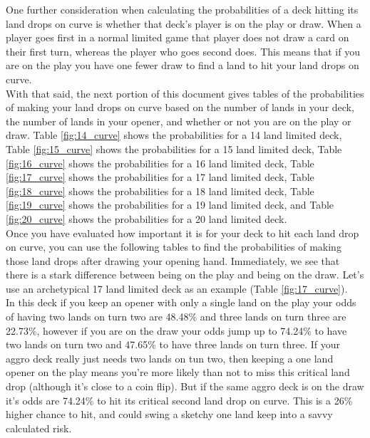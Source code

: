 \documentclass[oneside]{book}   %
\begin{document}
One further consideration when calculating the probabilities of a deck hitting its land drops on curve is whether that deck's player is on the play or draw. When a player goes first in a normal limited game that player does not draw a card on their first turn, whereas the player who goes second does. This means that if you are on the play you have one fewer draw to find a land to hit your land drops on curve. \\

With that said, the next portion of this document gives tables of the probabilities of making your land drops on curve based on the number of lands in your deck, the number of lands in your opener, and whether or not you are on the play or draw. Table \ref{fig:14_curve} shows the probabilities for a 14 land limited deck, Table \ref{fig:15_curve} shows the probabilities for a 15 land limited deck, Table \ref{fig:16_curve} shows the probabilities for a 16 land limited deck, Table \ref{fig:17_curve} shows the probabilities for a 17 land limited deck, Table \ref{fig:18_curve} shows the probabilities for a 18 land limited deck, Table \ref{fig:19_curve} shows the probabilities for a 19 land limited deck, and Table \ref{fig:20_curve} shows the probabilities for a 20 land limited deck. \\

Once you have evaluated how important it is for your deck to hit each land drop on curve, you can use the following tables to find the probabilities of making those land drops after drawing your opening hand. Immediately, we see that there is a stark difference between being on the play and being on the draw. Let's use an archetypical 17 land limited deck as an example (Table \ref{fig:17_curve}). \\

In this deck if you keep an opener with only a single land on the play your odds of having two lands on turn two are 48.48\% and three lands on turn three are 22.73\%, however if you are on the draw your odds jump up to 74.24\% to have two lands on turn two and 47.65\% to have three lands on turn three. If your aggro deck really just needs two lands on tun two, then keeping a one land opener on the play means you're more likely than not to miss this critical land drop (although it's close to a coin flip). But if the same aggro deck is on the draw it's odds are 74.24\% to hit its critical second land drop on curve. This is a 26\% higher chance to hit, and could swing a sketchy one land keep into a savvy calculated risk.\\
\end{document}

